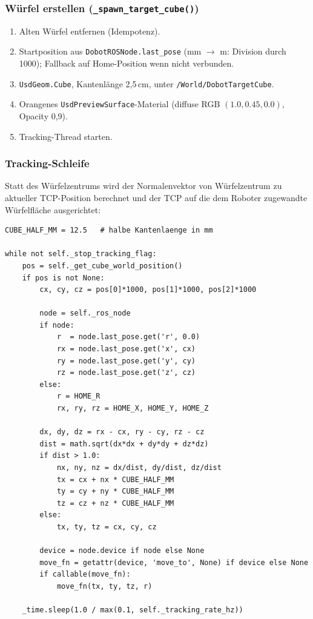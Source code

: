 \documentclass[11pt,a4paper]{article}
\begin{document}
\subsubsection{Würfel erstellen (\texttt{\_spawn\_target\_cube()})}

\begin{enumerate}
  \item Alten Würfel entfernen (Idempotenz).
  \item Startposition aus \texttt{DobotROSNode.last\_pose}
        (mm $\to$ m: Division durch 1000); Fallback auf
        Home-Position wenn nicht verbunden.
  \item \texttt{UsdGeom.Cube}, Kantenlänge 2,5\,cm,
        unter \texttt{/World/DobotTargetCube}.
  \item Orangenes \texttt{UsdPreviewSurface}-Material
        (diffuse RGB $(1.0, 0.45, 0.0)$, Opacity 0,9).
  \item Tracking-Thread starten.
\end{enumerate}

\subsubsection{Tracking-Schleife}

Statt des Würfelzentrums wird der Normalenvektor von
Würfelzentrum zu aktueller TCP-Position berechnet und der
TCP auf die dem Roboter zugewandte Würfelfläche ausgerichtet:

\begin{lstlisting}[caption={Tracking-Thread-Kernlogik}]
CUBE_HALF_MM = 12.5   # halbe Kantenlaenge in mm

while not self._stop_tracking_flag:
    pos = self._get_cube_world_position()
    if pos is not None:
        cx, cy, cz = pos[0]*1000, pos[1]*1000, pos[2]*1000

        node = self._ros_node
        if node:
            r  = node.last_pose.get('r', 0.0)
            rx = node.last_pose.get('x', cx)
            ry = node.last_pose.get('y', cy)
            rz = node.last_pose.get('z', cz)
        else:
            r = HOME_R
            rx, ry, rz = HOME_X, HOME_Y, HOME_Z

        dx, dy, dz = rx - cx, ry - cy, rz - cz
        dist = math.sqrt(dx*dx + dy*dy + dz*dz)
        if dist > 1.0:
            nx, ny, nz = dx/dist, dy/dist, dz/dist
            tx = cx + nx * CUBE_HALF_MM
            ty = cy + ny * CUBE_HALF_MM
            tz = cz + nz * CUBE_HALF_MM
        else:
            tx, ty, tz = cx, cy, cz

        device = node.device if node else None
        move_fn = getattr(device, 'move_to', None) if device else None
        if callable(move_fn):
            move_fn(tx, ty, tz, r)

    _time.sleep(1.0 / max(0.1, self._tracking_rate_hz))
\end{lstlisting}
\end{document}
